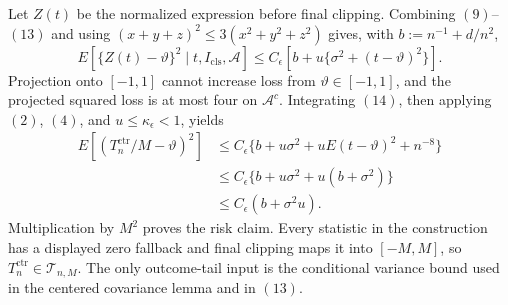 Let \(Z(t)\) be the normalized expression before final clipping.  Combining \((9)\)--\((13)\) and using \((x+y+z)^2\le3(x^2+y^2+z^2)\) gives, with \(b:=n^{-1}+d/n^2\),
\[
 E[\{Z(t)-\vartheta\}^2\mid t,I_{\mathrm{cls}},\mathcal A]
 \le C_{\epsilon}\left[
 b+u\{\sigma^2+(t-\vartheta)^2\}
 \right].
\tag{14}
\]
Projection onto \([-1,1]\) cannot increase loss from \(\vartheta\in[-1,1]\), and the projected squared loss is at most four on \(\mathcal A^c\).  Integrating \((14)\), then applying \((2)\), \((4)\), and \(u\le\kappa_{\epsilon}<1\), yields
\[
\begin{aligned}
 E[(T_n^{\mathrm{ctr}}/M-\vartheta)^2]
 &\le C_{\epsilon}\{b+u\sigma^2+uE(t-\vartheta)^2+n^{-8}\}\\
 &\le C_{\epsilon}\{b+u\sigma^2+u(b+\sigma^2)\}\\
 &\le C_{\epsilon}(b+\sigma^2u).
\end{aligned}
\tag{15}
\]
Multiplication by \(M^2\) proves the risk claim.  Every statistic in the construction has a displayed zero fallback and final clipping maps it into \([-M,M]\), so \(T_n^{\mathrm{ctr}}\in\mathcal T_{n,M}\).  The only outcome-tail input is the conditional variance bound used in the centered covariance lemma and in \((13)\).
